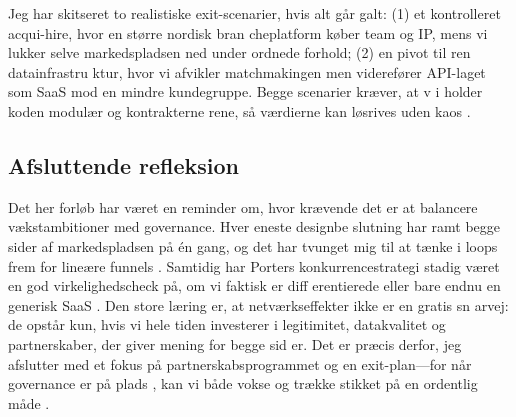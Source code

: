 Jeg har skitseret to realistiske exit-scenarier, hvis alt går galt: (1) et kontrolleret acqui-hire, hvor en større nordisk bran
cheplatform køber team og IP, mens vi lukker selve markedspladsen ned under ordnede forhold; (2) en pivot til ren datainfrastru
ktur, hvor vi afvikler matchmakingen men viderefører API-laget som SaaS mod en mindre kundegruppe. Begge scenarier kræver, at v
i holder koden modulær og kontrakterne rene, så værdierne kan løsrives uden kaos \citep{Reillier2017}.

\subsection*{Afsluttende refleksion}
Det her forløb har været en reminder om, hvor krævende det er at balancere vækstambitioner med governance. Hver eneste designbe
slutning har ramt begge sider af markedspladsen på én gang, og det har tvunget mig til at tænke i loops frem for lineære funnels
 \citep{Choudary2016}. Samtidig har Porters konkurrencestrategi stadig været en god virkelighedscheck på, om vi faktisk er diff
erentierede eller bare endnu en generisk SaaS \citep{Porter2008}. Den store læring er, at netværkseffekter ikke er en gratis sn
arvej: de opstår kun, hvis vi hele tiden investerer i legitimitet, datakvalitet og partnerskaber, der giver mening for begge sid
er. Det er præcis derfor, jeg afslutter med et fokus på partnerskabsprogrammet og en exit-plan---for når governance er på plads
, kan vi både vokse og trække stikket på en ordentlig måde \citep{Srnicek2017}.
